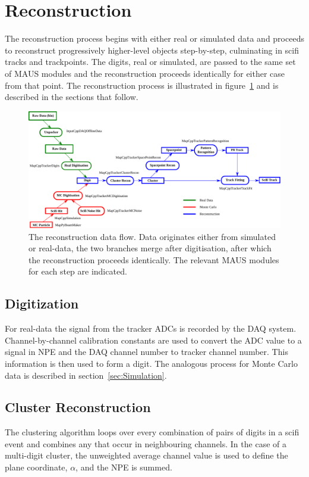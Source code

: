 \section{Reconstruction}
\label{sec:Reconstruction}
The reconstruction process begins with either real or simulated data and proceeds to reconstruct progressively higher-level objects step-by-step, culminating in scifi tracks and trackpoints. The digits, real or simulated, are passed to the same set of MAUS modules and the reconstruction proceeds identically for either case from that point. The reconstruction process is illustrated in figure~\ref{fig:DataFlow} and is described in the sections that follow.

\begin{figure}[tb]
  \begin{center}
    \includegraphics[width=0.95\linewidth]{07-Reconstruction/DataFlow2016.pdf}
    \caption{\label{fig:DataFlow} The reconstruction data flow. Data originates either from simulated or real-data, the two branches merge after digitisation, after which the reconstruction proceeds identically.  The relevant MAUS modules for each step are indicated.}
  \end{center}
\end{figure}

  \subsection{Digitization}
  \label{subsec:Digitization}
  For real-data the signal from the tracker ADCs is recorded by the DAQ system.  Channel-by-channel calibration constants are used to convert the ADC value to a signal in NPE and the DAQ channel number to tracker channel number.  This information is then used to form a digit.  The analogous process for Monte Carlo data is described in section~\ref{sec:Simulation}.

  \subsection{Cluster Reconstruction}
  \label{subsec:Clustering}
  The clustering algorithm loops over every combination of pairs of digits in a scifi event and combines any that occur in neighbouring channels. In the case of a multi-digit cluster, the unweighted average channel value is used to define the plane coordinate, $\alpha$, and the NPE is summed.


